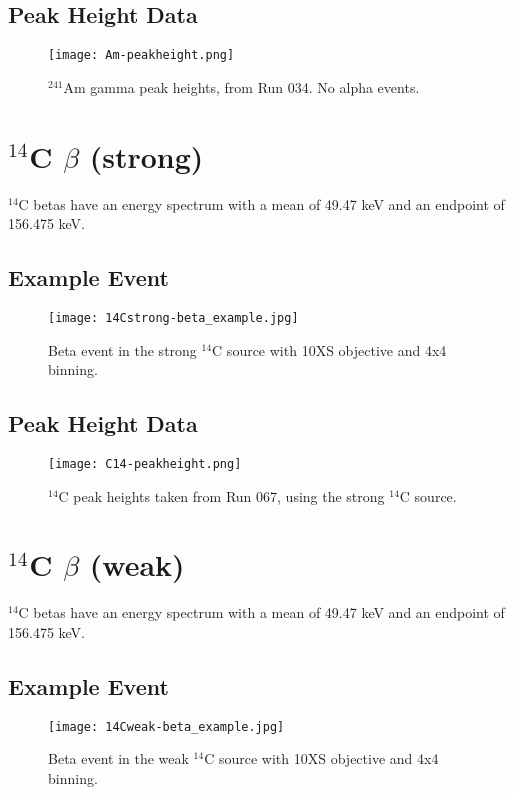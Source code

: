 \documentclass[a4paper,10pt]{article}
\begin{document}
\subsection{Peak Height Data}
\begin{figure}[!htbp]
	\centering
	\texttt{[image: Am-peakheight.png]}
	\caption{$^{241}$Am gamma peak heights, from Run 034. No alpha events.}
	\label{fig:Am-gamma-peakheights}
\end{figure}

\section{$^{14}$C $\beta$ (strong)}

$^{14}$C betas have an energy spectrum with a mean of 49.47 keV and an endpoint of 156.475 keV.

\subsection{Example Event}
\begin{figure}[!htbp]
	\centering
	\texttt{[image: 14Cstrong-beta\_example.jpg]}
	\caption{Beta event in the strong $^{14}$C source with 10XS objective and 4x4 binning.}
	\label{fig:10XSCstrongbeta}
\end{figure}

\subsection{Peak Height Data}
\begin{figure}[!htbp]
	\centering
	\texttt{[image: C14-peakheight.png]}
	\caption{$^{14}$C peak heights taken from Run 067, using the strong $^{14}$C source.}
	\label{fig:C-peakheights}
\end{figure}

\section{$^{14}$C $\beta$ (weak)}

$^{14}$C betas have an energy spectrum with a mean of 49.47 keV and an endpoint of 156.475 keV.

\subsection{Example Event}
\begin{figure}[!htbp]
	\centering
	\texttt{[image: 14Cweak-beta\_example.jpg]}
	\caption{Beta event in the weak $^{14}$C source with 10XS objective and 4x4 binning.}
	\label{fig:10XScweakbeta}
\end{figure}
\end{document}
